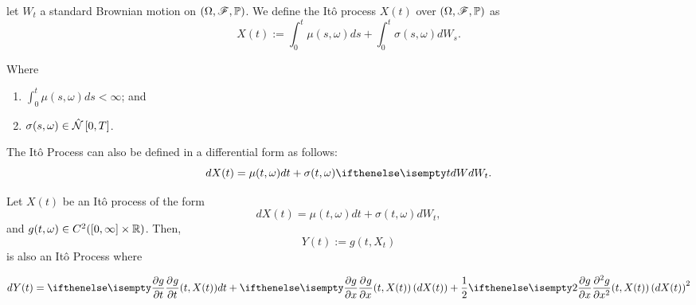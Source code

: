 \documentclass[../TGMAFFIRO.tex]{subfiles}
\begin{document}
\begin{definition}\label{def:ito_process}
	let $W_t$ a standard Brownian motion on $(\Omega, \mathscr{F}, \mathbb{P})$. We define the It\^o process $X(t)$ over $(\Omega, \mathscr{F}, \mathbb{P})$ as
	\begin{equation}
		X(t) := \int_0^t\mu(s,\omega) ds  + \int_0^t\sigma(s,\omega) dW_s.
	\end{equation}
	
	Where
	\begin{enumerate}
		\item $\int_0^t \mu(s,\omega) ds < \infty$; and
		\item $\sigma(s,\omega) \in \hat{\mathcal{N}}\left[0, T\right]$.
	\end{enumerate}
	
	The It\^o Process can also be defined in a differential form as follows:
	\begin{equation}
		dX(t) = \mu(t, \omega) dt + \sigma(t, \omega) \dW[t].
	\end{equation}
\end{definition}

\begin{theorem}\label{th:itos_formula}
	Let $X(t)$ be an It\^o process of the form
	\[
		dX(t) = \mu(t, \omega) dt + \sigma(t, \omega) dW_t,
	\]
	and $g(t, \omega) \in C^2([0, \infty]\times\mathbb{R})$. Then,
	\begin{equation}
		Y(t) := g(t, X_t)
	\end{equation}
	is also an It\^o Process where
	
	\begin{equation}\label{eq:itos_formula}
		dY(t) = \partialwrt{g}{t}(t, X(t)) dt + \partialwrt{g}{x}(t, X(t)) \left(dX(t)\right) + \frac{1}{2}\partialwrt[2]{g}{x} (t, X(t)) \left(dX(t)\right)^2
	\end{equation}	
\end{theorem}
\end{document}

